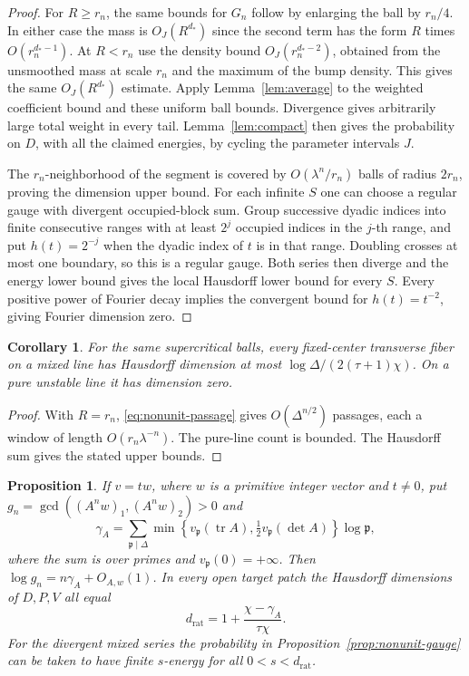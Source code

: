 \documentclass[11pt,a4paper,reqno]{amsart}
\newtheorem{proposition}[theorem]{Proposition}
\newtheorem{corollary}[theorem]{Corollary}
\theoremstyle{definition}
\theoremstyle{remark}
\numberwithin{equation}{section}
\begin{document}
\begin{proof}
For \(R\ge r_n\), the same bounds for \(G_n\) follow by
enlarging the ball by \(r_n/4\). In either case the mass is
\(O_J(R^{d_*})\) since the second term has the form
\(R\) times \(O(r_n^{d_*-1})\). At \(R<r_n\) use the density
bound \(O_J(r_n^{d_*-2})\), obtained from the unsmoothed mass
at scale \(r_n\) and the maximum of the bump density. This gives
the same \(O_J(R^{d_*})\) estimate. Apply Lemma~\ref{lem:average}
to the weighted coefficient bound and these uniform ball
bounds. Divergence gives arbitrarily large total weight in
every tail. Lemma~\ref{lem:compact} then gives the probability
on \(D\), with all the claimed energies, by cycling the parameter
intervals \(J\).

The \(r_n\)-neighborhood of the segment is covered by
\(O(\lambda^n/r_n)\) balls of radius \(2r_n\), proving the
dimension upper bound. For each infinite \(S\) one can choose a
regular gauge with divergent occupied-block sum. Group successive
dyadic indices into finite consecutive ranges with at least \(2^j\)
occupied indices in the \(j\)-th range, and put
\(h(t)=2^{-j}\) when the dyadic index of \(t\) is in that range.
Doubling crosses at most one boundary, so this is a regular
gauge. Both series then diverge and the energy lower bound
gives the local Hausdorff lower bound for every \(S\).
Every positive power of Fourier decay implies the convergent
bound for \(h(t)=t^{-2}\), giving Fourier dimension zero.
\end{proof}

\begin{corollary}\label{cor:nonunit-fiber-bound}
For the same supercritical balls, every fixed-center transverse
fiber on a mixed line has Hausdorff dimension at most
\(\log\Delta/(2(\tau+1)\chi)\). On a pure unstable line it has
dimension zero.
\end{corollary}

\begin{proof}
With \(R=r_n\), \eqref{eq:nonunit-passage} gives
\(O(\Delta^{n/2})\) passages, each a window of length
\(O(r_n\lambda^{-n})\). The pure-line count is bounded.
The Hausdorff sum gives the stated upper bounds.
\end{proof}

\begin{proposition}\label{prop:rational-winding}
If \(v=t w\), where \(w\) is a primitive integer vector and
\(t\ne0\), put \(g_n=\gcd((A^nw)_1,(A^nw)_2)>0\) and
\[
 \gamma_A=\sum_{\mathfrak p\mid\Delta}
 \min\left\{v_{\mathfrak p}(\operatorname{tr} A),
            \tfrac12 v_{\mathfrak p}(\det A)\right\}
 \log\mathfrak p ,
\]
where the sum is over primes and \(v_{\mathfrak p}(0)=+\infty\).
Then \(\log g_n=n\gamma_A+O_{A,w}(1)\). In every open target
patch the Hausdorff dimensions of \(D,P,V\) all equal
\begin{equation}\label{eq:rational-winding-dimension}
 d_{\mathrm{rat}}=1+\frac{\chi-\gamma_A}{\tau\chi}.
\end{equation}
For the divergent mixed series the probability in
Proposition~\ref{prop:nonunit-gauge} can be taken to have finite
\(s\)-energy for all \(0<s<d_{\mathrm{rat}}\).
\end{proposition}
\end{document}
